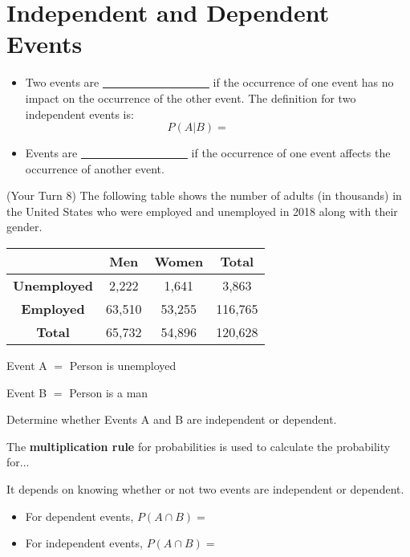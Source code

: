 \documentclass[12pt, letterpaper]{article}
\newcounter{exercise}
\theoremstyle{definition}
\begin{document}
\newpage

\section*{Independent and Dependent Events}

\begin{defn}

\begin{itemize}
\item Two events are \underline{~~~~~~~~~~~~~~~~~~~} if the occurrence of one event has no impact on the occurrence of the other event.  The definition for two independent events is:
$$ \boxed{P(A|B)=~~~~~~~~~~~~~~~~} $$
\item Events are \underline{~~~~~~~~~~~~~~~~~~~} if the occurrence of one event affects the occurrence of another event.
\end{itemize}
\end{defn}

\begin{exercise} (Your Turn 8)
The following table shows the number of adults (in thousands) in the United States who were employed and unemployed in 2018 along with their gender.
\begin{center}
\begin{tabular}{c|c c c}
 & \textbf{Men} & \textbf{Women} & \textbf{Total}\\ \hline
\textbf{Unemployed} & 2,222 & 1,641 & 3,863\\
\textbf{Employed} & 63,510 & 53,255 & 116,765\\
\textbf{Total} & 65,732 & 54,896 & 120,628
\end{tabular}
\end{center}

\vspace*{.2in}


Event A $=$ Person is unemployed

Event B $=$ Person is a man

\vspace*{.2in}

Determine whether Events A and B are independent or dependent.

\end{exercise}

\vfill

\newpage

\begin{statement}
The \textbf{multiplication rule} for probabilities is used to calculate the probability for...
\vspace*{.5in}

It depends on knowing whether or not two events are independent or dependent.
\begin{itemize}
\item For dependent events, $P(A\cap B) = ~~~~~~~~~~~$
\vspace*{.1in}
\item For independent events, $P(A\cap B) = ~~~~~~~~~~~$
\vspace*{.1in}
\end{itemize}
\end{statement}
\end{document}

